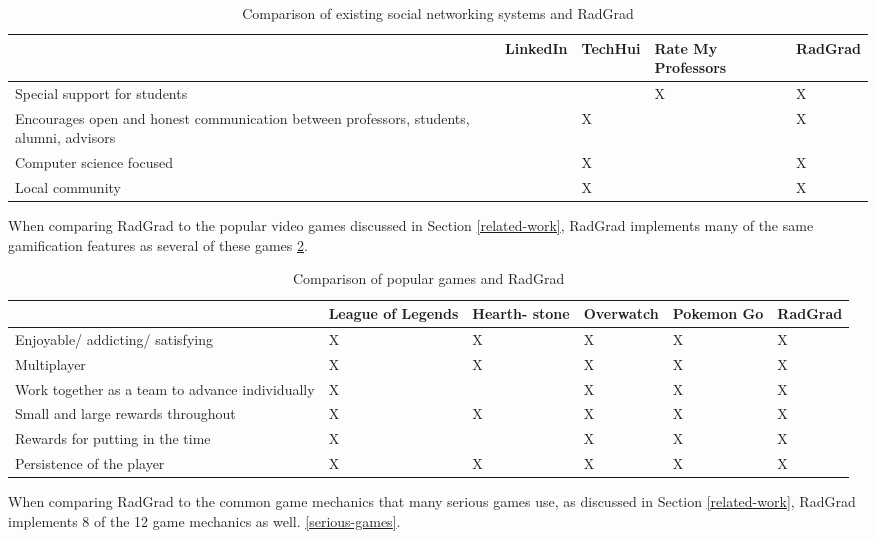 \begin{table}[htbp!]
\centering
\begin{tabular}{ |p{8cm}|p{2cm}|p{2cm}|p{2cm}|p{2cm}| } 
  \hline
 \textbf{} & \textbf{LinkedIn} & \textbf{TechHui} & \textbf{Rate My Professors} &  \textbf{RadGrad} \\ 
  \hline
  Special support for students & & & X & X\\
  \hline
    Encourages open and honest communication between professors, students, alumni, advisors
 & & X & & X\\
  \hline
   Computer science focused & & X & & X\\
  \hline
  Local community & & X & & X\\
  \hline

\end{tabular}
 \caption{Comparison of existing social networking systems and RadGrad}
 \label{social-compare}
\end{table}

When comparing RadGrad to the popular video games discussed in Section \ref{related-work}, RadGrad implements many of the same gamification features as several of these games \ref{gamification-compare}. 

\begin{table}[htbp!]
\centering
\begin{tabular}{ |p{3cm}|p{2cm}|p{2cm}|p{2cm}|p{2cm}|p{2cm}| } 
  \hline
 \textbf{} & \textbf{League of Legends} & \textbf{Hearth- stone} & \textbf{Overwatch} & \textbf{Pokemon Go} & \textbf{RadGrad} \\ 
  \hline
  Enjoyable/ addicting/ satisfying & X & X & X & X & X\\
  \hline
   Multiplayer & X & X & X & X & X\\
  \hline
    Work together as a team to advance individually & X & & X & X & X\\
  \hline
    Small and large rewards throughout & X & X & X & X & X\\
  \hline
    Rewards for putting in the time & X &  & X & X & X\\
  \hline
    Persistence of the player & X & X & X & X & X\\
  \hline
\end{tabular}
 \caption{Comparison of popular games and RadGrad}
  \label{gamification-compare}
\end{table}

When comparing RadGrad to the common game mechanics that many serious games use, as discussed in Section \ref{related-work}, RadGrad implements 8 of the 12 game mechanics as well. \ref{serious-games}. 

